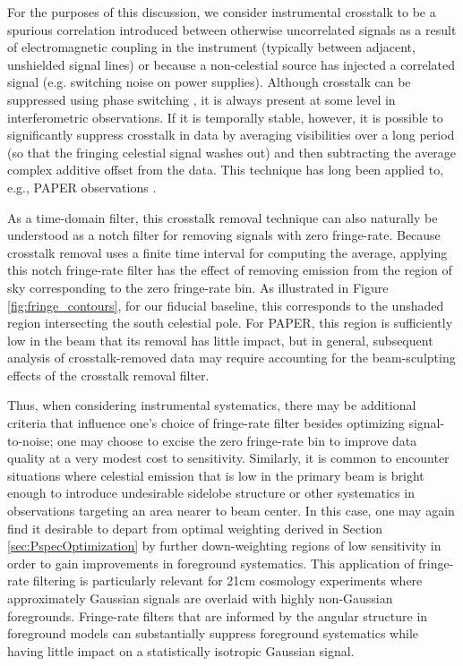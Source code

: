 \documentclass[twocolumn,apj,numberedappendix]{emulateapj}
\begin{document}
For the purposes of this discussion, we consider instrumental crosstalk to be a spurious 
correlation introduced between otherwise uncorrelated signals
as a result of electromagnetic coupling in the instrument (typically between adjacent, unshielded signal lines)
or because a non-celestial source has injected a correlated signal (e.g. switching noise on power supplies).
Although crosstalk can be suppressed using phase switching \citep{ryle1952}, it is always present at some level
in interferometric observations.  If it is temporally stable, however, it is possible to significantly
suppress crosstalk in data by averaging visibilities over a long period (so that the fringing celestial
signal washes out) and then subtracting the average complex additive offset from the data.  This 
technique has
long been applied to, e.g., PAPER observations \citep{parsons_et_al2010,pober_et_al2013,J14,P14,ali_et_al2015}.

As a time-domain filter, this crosstalk removal technique can also naturally be understood as a notch filter
for removing signals with zero fringe-rate.  Because crosstalk removal uses a finite time interval for computing
the average, applying this notch fringe-rate filter has the effect of removing emission from the region of
sky corresponding to the zero fringe-rate bin.  As illustrated in Figure \ref{fig:fringe_contours}, for our
fiducial baseline,
this corresponds to the unshaded region intersecting the south celestial pole.
For PAPER, this region is sufficiently low in the beam that its removal has little impact, but in general, 
subsequent analysis of crosstalk-removed data may require accounting for the beam-sculpting effects of
the crosstalk removal filter.

Thus, when considering instrumental systematics, there may be additional criteria that influence one's
choice of fringe-rate filter besides optimizing signal-to-noise; one may choose to excise the zero fringe-rate
bin to improve data quality at a very modest cost to sensitivity.  Similarly, it is common to encounter situations
where celestial emission that is low in the primary beam is bright enough to introduce undesirable 
sidelobe structure or other systematics in observations targeting an area nearer to beam center.  In this case,
one may again find it desirable to depart from optimal weighting derived in Section \ref{sec:PspecOptimization}
by further down-weighting regions of low sensitivity in order to gain improvements in foreground systematics.
This application of fringe-rate filtering is particularly relevant for 21cm cosmology experiments where approximately
Gaussian signals are overlaid with highly non-Gaussian foregrounds.  Fringe-rate filters that are informed by 
the angular structure in foreground models can substantially suppress foreground systematics while having little
impact on a statistically isotropic Gaussian signal.
\end{document}
